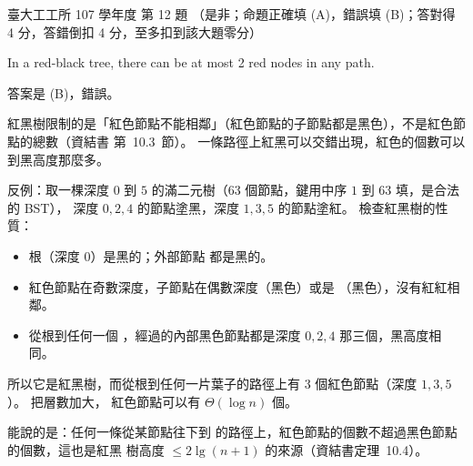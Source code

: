 \begin{pastexam}[label={px:ntu-107-ie-ds-12}]{臺大工工所 107 學年度 第 12 題}
（是非；命題正確填 (A)，錯誤填 (B)；答對得 4 分，答錯倒扣 4 分，至多扣到該大題零分）

In a red-black tree, there can be at most 2 red nodes in any path.
\end{pastexam}

\begin{pastsoln}
答案是 (B)，錯誤。

紅黑樹限制的是「紅色節點不能相鄰」（紅色節點的子節點都是黑色），不是紅色節點的總數（資結書
第~10.3~節）。 一條路徑上紅黑可以交錯出現，紅色的個數可以到黑高度那麼多。

反例：取一棵深度 $0$ 到 $5$ 的滿二元樹（$63$ 個節點，鍵用中序 $1$ 到 $63$ 填，是合法的 BST），
深度 $0, 2, 4$ 的節點塗黑，深度 $1, 3, 5$ 的節點塗紅。 檢查紅黑樹的性質：
\begin{itemize}
\item 根（深度 $0$）是黑的；外部節點 \NIL 都是黑的。
\item 紅色節點在奇數深度，子節點在偶數深度（黑色）或是 \NIL（黑色），沒有紅紅相鄰。
\item 從根到任何一個 \NIL，經過的內部黑色節點都是深度 $0, 2, 4$ 那三個，黑高度相同。
\end{itemize}
所以它是紅黑樹，而從根到任何一片葉子的路徑上有 $3$ 個紅色節點（深度 $1, 3, 5$）。 把層數加大，
紅色節點可以有 $\Theta(\log n)$ 個。

能說的是：任何一條從某節點往下到 \NIL 的路徑上，紅色節點的個數不超過黑色節點的個數，這也是紅黑
樹高度 $\le 2\lg(n+1)$ 的來源（資結書定理~10.4）。
\end{pastsoln}
